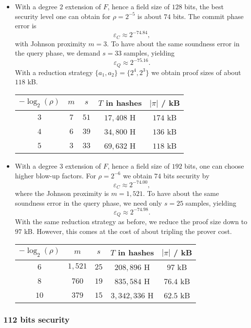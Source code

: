 \documentclass[11pt,article,oneside]{memoir}
\theoremstyle{definition}
\theoremstyle{remark}
\begin{document}
\begin{itemize}
\item
With a degree $2$ extension of $F$, hence a field size of $128$ bits, the best security level one can obtain for $\rho=2^{-5}$ is about $74$ bits. 
The commit phase error is 
\[
\varepsilon_C\approx 2^{-74.84},
\]
with Johnson proximity $m=3$. 
To have about the same soundness error in the query phase, we demand $s=33$ samples, yielding 
\[
\varepsilon_Q \approx 2^{-75.16}.
\] 
With a reduction strategy $\{a_1,a_2\}=\{2^4,2^3\}$ we obtain proof sizes of about $118$ kB. 
\begin{center}
\begin{tabular}{|c|c|c|c|c|}
\hline
$-\log_2(\rho)$ & $m$	& $s$	& $T$ in hashes 	& $|\pi|$ / kB
\\\hline\hline
$3$ 	& $7$	& $51$	& $17,408$ H 	& $174$ kB
\\
$4$ & $6$	& $39$	& $34,800$ H & $136$ kB
\\
$5$ & $3$	& $33$	& $69,632$ H 	& $118$ kB
\\\hline
\end{tabular}
\end{center}

\item
With a degree $3$ extension of $F$, hence a field size of $192$ bits, one can choose higher blow-up factors. 
For  $\rho =2^{-6}$ we obtain $74$ bits security by  
\[
\varepsilon_C\approx 2^{-74.00},
\]
where the Johnson proximity is $m=1,521$. 
To have about the same soundness error in the query phase, we need only $s=25$ samples, yielding 
\[
\varepsilon_Q\approx 2^{-74.98}.
\]
With the same reduction strategy as before, we reduce the proof size down to $97$ kB. 
However, this comes at the cost of about tripling the prover cost. 
\begin{center}
\begin{tabular}{|c|c|c|c|c|}
\hline
$-\log_2(\rho)$ & $m$	& $s$	& $T$ in hashes 	& $|\pi|$ / kB
\\\hline\hline
$6$ 	& $1,521$	& $25$	& $208,896$ H 	& $97$ kB
\\
$8$ & $760$	& $19$	& $835,584$ H & $76.4$ kB
\\
$10$ & $379$	& $15$	& $3,342,336$ H 	& $62.5$ kB
\\\hline
\end{tabular}
\end{center}

\end{itemize}


\subsubsection{112 bits security}
\end{document}

